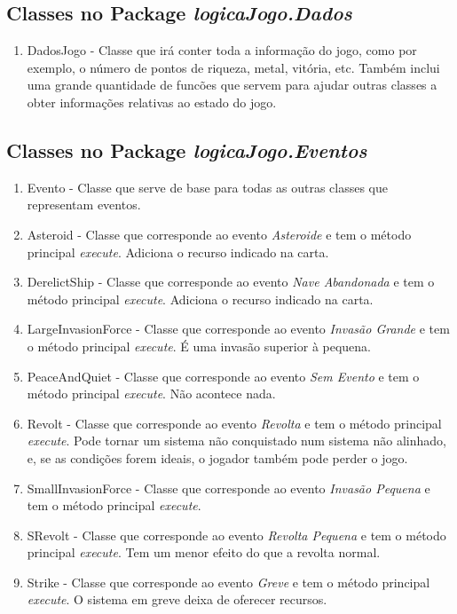 \documentclass[12pt,a4paper]{article}
\begin{document}
\newpage\noindent

\subsection{Classes no Package \textit{logicaJogo.Dados}}

\begin{enumerate}

\item DadosJogo - Classe que irá conter toda a informação do jogo, como por exemplo, o número de pontos de riqueza, metal, vitória, etc. Também inclui uma grande quantidade de funcões que servem para ajudar outras classes a obter informações relativas ao estado do jogo.
\end{enumerate}

\newpage\noindent

\subsection{Classes no Package \textit{logicaJogo.Eventos}}

\begin{enumerate}
\item Evento - Classe que serve de base para todas as outras classes que representam eventos.
\item Asteroid - Classe que corresponde ao evento \textit{Asteroide} e tem o método principal \textit{execute}. Adiciona o recurso indicado na carta.
\item DerelictShip - Classe que corresponde ao evento \textit{Nave Abandonada} e tem o método principal \textit{execute}. Adiciona o recurso indicado na carta.
\item LargeInvasionForce - Classe que corresponde ao evento \textit{Invasão Grande} e tem o método principal \textit{execute}. É uma invasão superior à pequena.
\item PeaceAndQuiet - Classe que corresponde ao evento \textit{Sem Evento} e tem o método principal \textit{execute}. Não acontece nada.
\item Revolt - Classe que corresponde ao evento \textit{Revolta} e tem o método principal \textit{execute}. Pode tornar um sistema não conquistado num sistema não alinhado, e, se as condições forem ideais, o jogador também pode perder o jogo.
\item SmallInvasionForce - Classe que corresponde ao evento \textit{Invasão Pequena} e tem o método principal \textit{execute}.
\item SRevolt - Classe que corresponde ao evento \textit{Revolta Pequena} e tem o método principal \textit{execute}. Tem um menor efeito do que a revolta normal.
\item Strike - Classe que corresponde ao evento \textit{Greve} e tem o método principal \textit{execute}. O sistema em greve deixa de oferecer recursos.
\end{enumerate}
\end{document}
